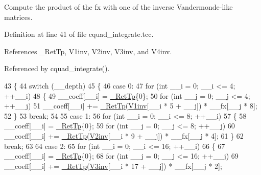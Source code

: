 Compute the product of the fx with one of the inverse Vandermonde-\/like matrices. 

Definition at line 41 of file cquad\+\_\+integrate.\+tcc.



References \+\_\+\+Ret\+Tp, V1inv, V2inv, V3inv, and V4inv.



Referenced by cquad\+\_\+integrate().


\begin{DoxyCode}
43     \{
44       \textcolor{keywordflow}{switch} (\_\_depth)
45         \{
46         \textcolor{keywordflow}{case} 0:
47           \textcolor{keywordflow}{for} (\textcolor{keywordtype}{int} \_\_i = 0; \_\_i <= 4; ++\_\_i)
48             \{
49               \_\_coeff[\_\_i] = \hyperlink{namespace____gnu__cxx_a886e03ece3d53ff7fa6c098a40f93fa5}{\_RetTp}\{0\};
50               \textcolor{keywordflow}{for} (\textcolor{keywordtype}{int} \_\_j = 0; \_\_j <= 4; ++\_\_j)
51                 \_\_coeff[\_\_i] += \hyperlink{namespace____gnu__cxx_a886e03ece3d53ff7fa6c098a40f93fa5}{\_RetTp}(\hyperlink{namespace____gnu__cxx_abac562ad4a226ad8799434617959af3d}{V1inv}[\_\_i * 5 + \_\_j]) * \_\_fx[\_\_j * 8];
52             \}
53           \textcolor{keywordflow}{break};
54 
55         \textcolor{keywordflow}{case} 1:
56           \textcolor{keywordflow}{for} (\textcolor{keywordtype}{int} \_\_i = 0; \_\_i <= 8; ++\_\_i)
57             \{
58               \_\_coeff[\_\_i] = \hyperlink{namespace____gnu__cxx_a886e03ece3d53ff7fa6c098a40f93fa5}{\_RetTp}\{0\};
59               \textcolor{keywordflow}{for} (\textcolor{keywordtype}{int} \_\_j = 0; \_\_j <= 8; ++\_\_j)
60                 \_\_coeff[\_\_i] +=  \hyperlink{namespace____gnu__cxx_a886e03ece3d53ff7fa6c098a40f93fa5}{\_RetTp}(\hyperlink{namespace____gnu__cxx_aa4b649154290c645f634d501d63fac0f}{V2inv}[\_\_i * 9 + \_\_j]) * \_\_fx[\_\_j * 4];
61             \}
62           \textcolor{keywordflow}{break};
63 
64         \textcolor{keywordflow}{case} 2:
65           \textcolor{keywordflow}{for} (\textcolor{keywordtype}{int} \_\_i = 0; \_\_i <= 16; ++\_\_i)
66             \{
67               \_\_coeff[\_\_i] = \hyperlink{namespace____gnu__cxx_a886e03ece3d53ff7fa6c098a40f93fa5}{\_RetTp}\{0\};
68               \textcolor{keywordflow}{for} (\textcolor{keywordtype}{int} \_\_j = 0; \_\_j <= 16; ++\_\_j)
69                 \_\_coeff[\_\_i] +=  \hyperlink{namespace____gnu__cxx_a886e03ece3d53ff7fa6c098a40f93fa5}{\_RetTp}(\hyperlink{namespace____gnu__cxx_ac23b44065db55792c4f65364f34ee956}{V3inv}[\_\_i * 17 + \_\_j]) * \_\_fx[\_\_j * 2];

\end{DoxyCode}
